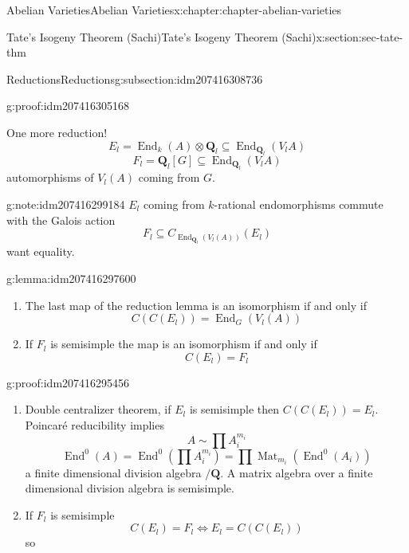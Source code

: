 \documentclass[oneside,10pt,]{book}
\numberwithin{equation}{section}
\newcommand{\QQ}{\mathbf{Q}}
\DeclareMathOperator{\End}{End}
\DeclareMathOperator{\Mat}{Mat}
\begin{document}
\begin{chapterptx}{Abelian Varieties}{}{Abelian Varieties}{}{}{x:chapter:chapter-abelian-varieties}
\begin{sectionptx}{Tate's Isogeny Theorem (Sachi)}{}{Tate's Isogeny Theorem (Sachi)}{}{}{x:section:sec-tate-thm}
\begin{subsectionptx}{Reductions}{}{Reductions}{}{}{g:subsection:idm207416308736}
\begin{proofptx}{}{g:proof:idm207416305168}
%
\end{proofptx}
One more reduction!%
\begin{equation*}
E_l = \End_k(A) \otimes \QQ_l\subseteq \End_{\QQ_l} (V_lA)
\end{equation*}
%
\begin{equation*}
F_l = \QQ_l[G] \subseteq \End_{\QQ_l} (V_lA)
\end{equation*}
automorphisms of \(V_l(A) \) coming from \(G\).%
\begin{note}{}{g:note:idm207416299184}%
\(E_l\) coming from \(k\)-rational endomorphisms commute with the Galois action%
\begin{equation*}
F_l\subseteq C_{\End_{\QQ_l}(V_l(A))}(E_l)
\end{equation*}
want equality.%
\end{note}
\begin{lemma}{}{}{g:lemma:idm207416297600}%
%
\begin{enumerate}
\item{}The last map of the reduction lemma is an isomorphism if and only if%
\begin{equation*}
C(C(E_l)) = \End_G(V_l(A))
\end{equation*}
%
\item{}If \(F_l\) is semisimple the map is an isomorphism if and only if%
\begin{equation*}
C(E_l) = F_l
\end{equation*}
%
\end{enumerate}
%
\end{lemma}
\begin{proofptx}{}{g:proof:idm207416295456}
%
\begin{enumerate}
\item{}Double centralizer theorem, if \(E_l\) is semisimple then \(C(C(E_l))= E_l\). Poincaré reducibility implies%
\begin{equation*}
A\sim \prod A_i^{m_i}
\end{equation*}
%
\begin{equation*}
\End^0(A) = \End^0(\prod A_i^{m_i}) = \prod \Mat_{m_i}(\End^0(A_i))
\end{equation*}
a finite dimensional division algebra \(/\QQ\). A matrix algebra over a finite dimensional division algebra is semisimple.%
\item{}If \(F_l\) is semisimple%
\begin{equation*}
C(E_l) = F_l \iff E_l = C(C(E_l))
\end{equation*}
so%
\begin{equation*}

\end{equation*}
\end{enumerate}
\end{proofptx}
\end{subsectionptx}
\end{sectionptx}
\end{chapterptx}
\end{document}
